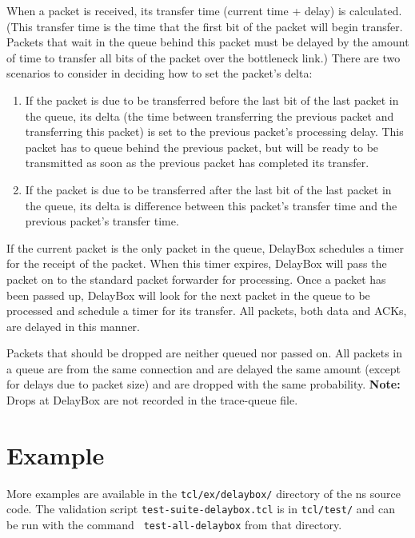 When a packet is received, its transfer time (current time + delay) is
calculated.  (This transfer time is the time that the first bit of the
packet will begin transfer.  Packets that wait in the queue behind
this packet must be delayed by the amount of time to transfer all bits
of the packet over the bottleneck link.)  There are two scenarios to
consider in deciding how to set the packet's delta:

\begin{enumerate}
  \item If the packet is due to be transferred before the last bit of
    the last packet in the queue, its delta (the time between transferring
   the previous packet and transferring this packet) is set to the
   previous packet's processing delay.  This packet has to queue
   behind the previous packet, but will be ready to be transmitted as
   soon as the previous packet has completed its transfer.
  \item If the packet is due to be transferred after the last bit of
    the last packet in the queue, its delta is difference between this
   packet's transfer time and the previous packet's transfer time.
\end{enumerate}

If the current packet is the only packet in the queue, DelayBox
schedules a timer for the receipt of the packet.  When this timer
expires, DelayBox will pass the packet on to the standard packet
forwarder for processing.  Once a packet has been passed up,
DelayBox will look for the next packet in the queue to be
processed and schedule a timer for its transfer. All packets, both
data and ACKs, are delayed in this manner.

Packets that should be dropped are neither queued nor passed on.  All
packets in a queue are from the same connection and are delayed
the same amount (except for delays due to packet size) and are
dropped with the same probability.  {\bf Note:} Drops at DelayBox are
not recorded in the trace-queue file.

\section{Example}
More examples are available in the {\tt tcl/ex/delaybox/} directory of the
ns source code.  The validation script {\tt test-suite-delaybox.tcl}
is in {\tt tcl/test/} and can be run with the command {\tt
test-all-delaybox} from that directory.

